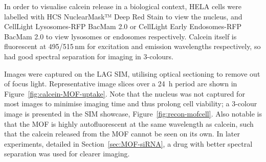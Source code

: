 In order to visualise calcein release in a biological context, HELA cells were labelled with HCS NuclearMask™ Deep Red Stain to view the nucleus, and CellLight Lysosomes-RFP BacMam 2.0 or CellLight Early Endosomes-RFP BacMam 2.0 to view lysosomes or endosomes respectively. 
Calcein itself is fluorescent at 495/515\,\si{\nano\meter} for excitation and emission wavelengths respectively, so had good spectral separation for imaging in 3-colours. %

Images were captured on the LAG SIM, utilising optical sectioning to remove out of focus light. 
Representative image slices over a \SI{24}{\hour} period are shown in Figure~\ref{fig:calcein-MOF-uptake}. 
Note that the nucleus was not captured for most images to minimise imaging time and thus prolong cell viability; a 3-colour image is presented in the SIM showcase, Figure~\ref{fig:recon-mofcell}. 
Also notable is that the MOF is highly autofluorescent at the same wavelength as calcein, such that the calcein released from the MOF cannot be seen on its own. 
In later experiments, detailed in Section~\ref{sec:MOF-siRNA}, a drug with better spectral separation was used for clearer imaging.

